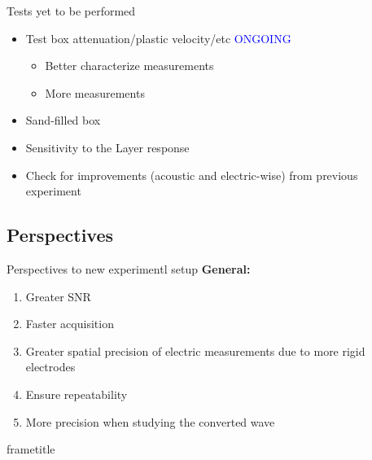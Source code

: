\documentclass[utf8]{beamer} \usetheme{lfcr} %
\begin{document}
%
\begin{frame}{Tests yet to be performed}
  \begin{itemize}
    \item {Test box attenuation/plastic velocity/etc \textcolor{blue}{ONGOING}
      \begin{itemize}
        \item Better characterize measurements
          \item More measurements
      \end{itemize}
      }
    \item Sand-filled box
    \item Sensitivity to the Layer response
    \item Check for improvements (acoustic and electric-wise) from previous experiment
  \end{itemize}
\end{frame}
%
\subsection{Perspectives}
\begin{frame}{Perspectives to new experimentl setup}
  \textbf{General:}
  \begin{enumerate}
    \item Greater SNR
    \item Faster acquisition
    \item Greater spatial precision of electric measurements due to more rigid
      electrodes
    \item Ensure repeatability
    \item More precision when studying the converted wave
  \end{enumerate}

\end{frame}
  
\begin{frame}{}
  \centering
  \begin{beamercolorbox}[wd=\paperwidth, ht=1.2cm]{frametitle}
  \end{beamercolorbox}
\end{frame}
\end{document}
